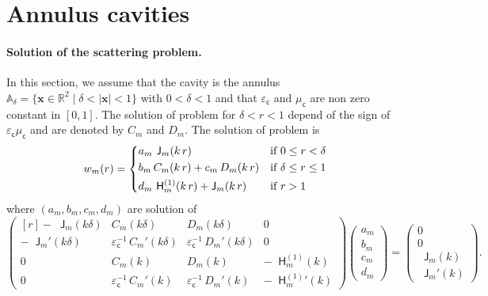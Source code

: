 \documentclass[12pt,a4paper]{article}
\theoremstyle{definition}
\theoremstyle{plain}
\theoremstyle{remark}
\newcommand{\bbA}{\mathbb{A}}
\newcommand{\bbR}{\mathbb{R}}
\newcommand{\bJ}{\mathop{}\!\mathsf{J}}
\newcommand{\Hu}{\mathop{}\!\mathsf{H}^{(1)}}
\newcommand{\vx}{\boldsymbol{x}}
\newcommand{\ecav}{\varepsilon_\mathsf{c}}
\newcommand{\mcav}{\mu_\mathsf{c}}
\begin{document}
\section{Annulus cavities}

\paragraph{Solution of the scattering problem.}
In this section, we assume that the cavity is the annulus $\bbA_\delta = \{\vx \in \bbR^2 \mid \delta < |\vx| < 1\}$ with $0 < \delta < 1$ and that $\ecav$ and $\mcav$ are non zero constant in $[0, 1]$.
The solution of problem  for $\delta < r < 1$ depend of the sign of $\ecav\mcav$ and are denoted by $C_m$ and $D_m$.
The solution of problem  is
\begin{equation}
    w_m(r) = \begin{dcases}
        a_m\, \bJ_m(k\, r)                  & \text{if } 0 \le r < \delta   \\
        b_m\, C_m(k\, r) + c_m\, D_m(k\, r) & \text{if } \delta \le r \le 1 \\
        d_m\, \Hu_m(k\, r) + \bJ_m(k\, r)   & \text{if } r > 1
    \end{dcases}
\end{equation}
where $(a_m, b_m, c_m, d_m)$ are solution of
\begin{equation}
    \begin{pmatrix*}[r]
        -\bJ_m(k\delta) & C_m(k\delta) & D_m(k\delta) & 0\\[1ex]
        -\bJ_m'(k\delta) & \ecav^{-1}\, C_m'(k\delta) & \ecav^{-1}\, D_m'(k\delta) & 0\\[1ex]
        0 & C_m(k) & D_m(k) & -\Hu_m(k)\\[1ex]
        0 & \ecav^{-1}\, C_m'(k) & \ecav^{-1}\, D_m'(k) & -{\Hu_m}'(k)
    \end{pmatrix*}
    \begin{pmatrix}
        a_m \\[1ex]
        b_m \\[1ex]
        c_m \\[1ex]
        d_m
    \end{pmatrix} =
    \begin{pmatrix}
        0        \\[1ex]
        0        \\[1ex]
        \bJ_m(k) \\[1ex]
        \bJ_m'(k)
    \end{pmatrix}.
\end{equation}
\end{document}
